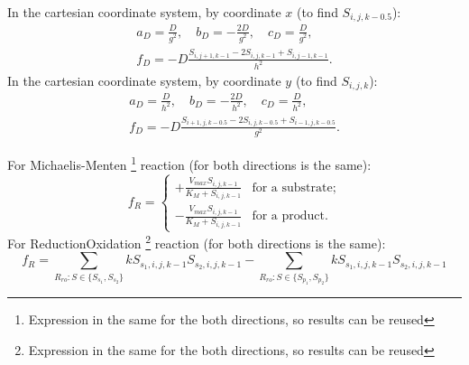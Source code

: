 \documentclass[a4paper,10pt]{article}
\begin{document}
In the cartesian coordinate system, by coordinate $x$ (to find $S_{i,j,k-0.5}$):
\begin{multline}
    a_D = \frac{D}{g^2},\quad
    b_D = -\frac{2 D}{g^2},\quad
    c_D = \frac{D}{g^2},\\
    f_D = - D \frac{S_{i,j+1,k-1} - 2 S_{i,j,k-1} + S_{i,j-1,k-1}}{h^2}.
\end{multline}
In the cartesian coordinate system, by coordinate $y$ (to find $S_{i,j,k}$):
\begin{multline}
    a_D = \frac{D}{h^2},\quad
    b_D = -\frac{2 D}{h^2},\quad
    c_D = \frac{D}{h^2},\\
    f_D = - D \frac{S_{i+1,j,k-0.5} - 2 S_{i,j,k-0.5} + S_{i-1,j,k-0.5}}{g^2}.
\end{multline}

For Michaelis-Menten%
\footnote{Expression in the same for the both directions, so results can be reused}
reaction (for both directions is the same):
\begin{equation}
    f_R =
        \begin{cases}
            +\frac{V_{max} S_{i,j,k-1}}{K_M + S_{i,j,k-1}} &\text{for a substrate};\\
            -\frac{V_{max} S_{i,j,k-1}}{K_M + S_{i,j,k-1}} &\text{for a product}.
        \end{cases}
\end{equation}
For ReductionOxidation%
\footnote{Expression in the same for the both directions, so results can be reused}
reaction (for both directions is the same):
\begin{equation}
    f_R =
         \sum_{R_{ro} : S \in \{S_{s_1}, S_{s_2}\}} k S_{s_1,i,j,k-1} S_{s_2,i,j,k-1}
        -\sum_{R_{ro} : S \in \{S_{p_1}, S_{p_2}\}} k S_{s_1,i,j,k-1} S_{s_2,i,j,k-1}
\end{equation}
\end{document}
